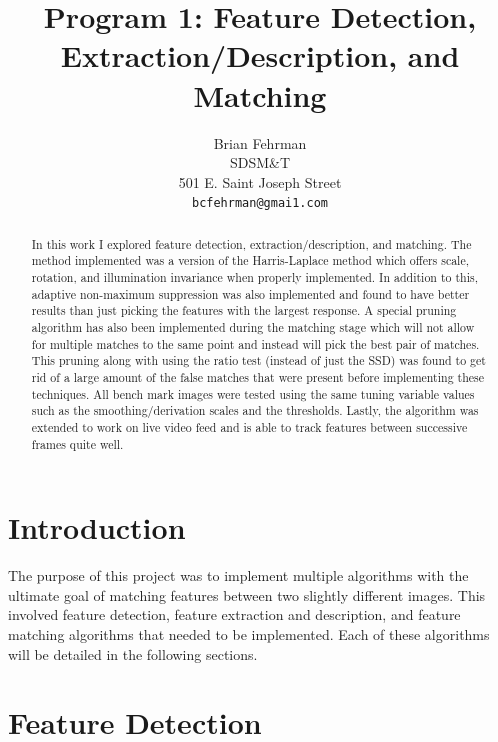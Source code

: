 \documentclass[10pt,twocolumn,letterpaper]{article}
\begin{document}
\title{ Program 1: Feature Detection, Extraction/Description, and Matching}

\author{Brian Fehrman\\
SDSM\&T\\
501 E. Saint Joseph Street\\
{\tt\small bcfehrman@gmai1.com}
\thispagestyle{empty}
}

\maketitle
\begin{abstract}
In this work I explored feature detection, extraction/description, and matching. The method implemented was a version of the Harris-Laplace method which offers scale, rotation, and illumination invariance when properly implemented. In addition to this, adaptive non-maximum suppression was also implemented and found to have better results than just picking the features with the largest response. A special pruning algorithm has also been implemented during the matching stage which will not allow for multiple matches to the same point and instead will pick the best pair of matches. This pruning along with using the ratio test (instead of just the SSD) was found to get rid of a large amount of the false matches that were present before implementing these techniques. All bench mark images were tested using the same tuning variable values such as the smoothing/derivation scales and the thresholds. Lastly, the algorithm was extended to work on live video feed and is able to track features between successive frames quite well.

\end{abstract}



\section{Introduction}
The purpose of this project was to implement multiple algorithms with the ultimate goal of matching features between two slightly different images. This involved feature detection, feature extraction and description, and feature matching algorithms that needed to be implemented. Each of these algorithms will be detailed in the following sections.

\section{Feature Detection}
\end{document}
